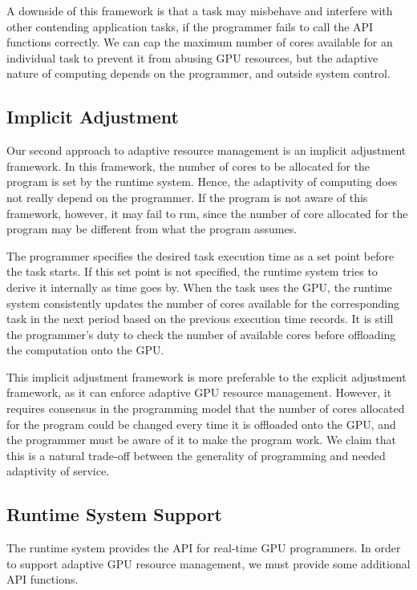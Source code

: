 \documentclass{acm_proc_article-sp}
\begin{document}
A downside of this framework is that a task may misbehave
and interfere with other contending application tasks, if the programmer
fails to call the API functions correctly.
We can cap the maximum number of cores available for an individual task
to prevent it from abusing GPU resources, but the adaptive nature of computing
depends on the programmer, and outside system control.

\subsection{Implicit Adjustment}

Our second approach to adaptive resource management is an implicit
adjustment framework.
In this framework, the number of cores to be allocated for the program
is set by the runtime system.
Hence, the adaptivity of computing does not really depend on the programmer.
If the program is not aware of this framework, however, it may fail to
run, since the number of core allocated for the program may be different
from what the program assumes.

The programmer specifies the desired task execution time as a set point
before the task starts.
If this set point is not specified, the runtime system tries to derive
it internally as time goes by.
When the task uses the GPU, the runtime system consistently updates the
number of cores available for the corresponding task in the next period
based on the previous execution time records.
It is still the programmer's duty to check the number of available cores before
offloading the computation onto the GPU.

This implicit adjustment framework is more preferable to the explicit
adjustment framework, as it can enforce adaptive GPU resource
management.
However, it requires consensus in the programming model that the number
of cores allocated for the program could be changed every time it is
offloaded onto the GPU, and the programmer must be aware of it to make
the program work.
We claim that this is a natural trade-off between the generality of
programming and needed adaptivity of service.

\subsection{Runtime System Support}
\label{sec:runtime}

The runtime system provides the API for real-time GPU programmers.
In order to support adaptive GPU resource management, we must provide
some additional API functions.
\end{document}
